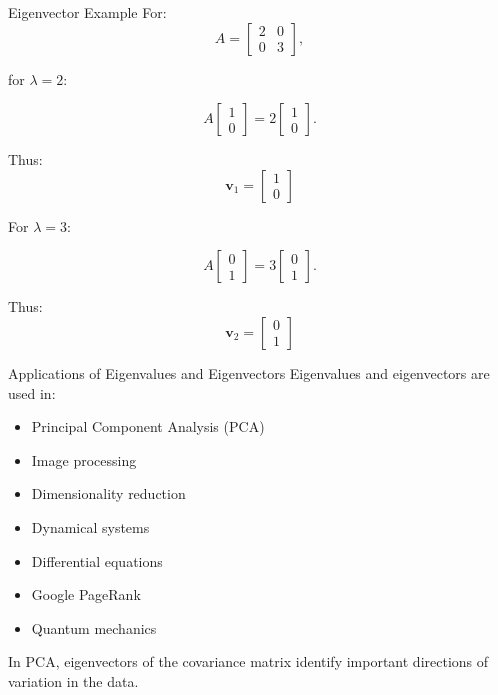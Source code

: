\documentclass[aspectratio=169]{beamer}
\begin{document}
\begin{frame}{Eigenvector Example}
For:
\[
A=
\begin{bmatrix}
2&0\\0&3
\end{bmatrix},
\]

for $\lambda=2$:

\[
A
\begin{bmatrix}1\\0\end{bmatrix}
=
2
\begin{bmatrix}1\\0\end{bmatrix}.
\]

Thus:
\[
\boxed{
\mathbf v_1=
\begin{bmatrix}1\\0\end{bmatrix}
}
\]

For $\lambda=3$:

\[
A
\begin{bmatrix}0\\1\end{bmatrix}
=
3
\begin{bmatrix}0\\1\end{bmatrix}.
\]

Thus:
\[
\boxed{
\mathbf v_2=
\begin{bmatrix}0\\1\end{bmatrix}
}
\]
\end{frame}

\begin{frame}{Applications of Eigenvalues and Eigenvectors}
Eigenvalues and eigenvectors are used in:

\begin{itemize}
\item Principal Component Analysis (PCA)
\item Image processing
\item Dimensionality reduction
\item Dynamical systems
\item Differential equations
\item Google PageRank
\item Quantum mechanics
\end{itemize}

In PCA, eigenvectors of the covariance matrix identify important directions of variation in the data.
\end{frame}
\end{document}
